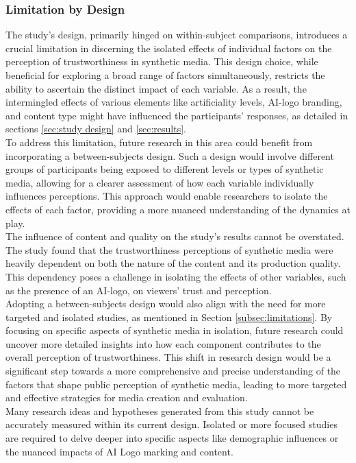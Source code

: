 \documentclass[
  a4paper,  %
  twoside,  %
  bibliography=totoc,
  headsepline,
  cleardoublepage=empty,
  parskip=half,
  draft=false
]{scrbook}
\begin{document}
\subsubsection{Limitation by Design}
The study's design, primarily hinged on within-subject comparisons, introduces a crucial limitation in discerning the isolated effects of individual factors on the perception of trustworthiness in synthetic media. This design choice, while beneficial for exploring a broad range of factors simultaneously, restricts the ability to ascertain the distinct impact of each variable. As a result, the intermingled effects of various elements like artificiality levels, AI-logo branding, and content type might have influenced the participants' responses, as detailed in sections \ref{sec:study design} and \ref{sec:results}. \\
To address this limitation, future research in this area could benefit from incorporating a between-subjects design. Such a design would involve different groups of participants being exposed to different levels or types of synthetic media, allowing for a clearer assessment of how each variable individually influences perceptions. This approach would enable researchers to isolate the effects of each factor, providing a more nuanced understanding of the dynamics at play. \\
The influence of content and quality on the study's results cannot be overstated. The study found that the trustworthiness perceptions of synthetic media were heavily dependent on both the nature of the content and its production quality. This dependency poses a challenge in isolating the effects of other variables, such as the presence of an AI-logo, on viewers' trust and perception. \\
Adopting a between-subjects design would also align with the need for more targeted and isolated studies, as mentioned in Section \ref{subsec:limitations}. By focusing on specific aspects of synthetic media in isolation, future research could uncover more detailed insights into how each component contributes to the overall perception of trustworthiness. This shift in research design would be a significant step towards a more comprehensive and precise understanding of the factors that shape public perception of synthetic media, leading to more targeted and effective strategies for media creation and evaluation. \\

Many research ideas and hypotheses generated from this study cannot be accurately measured within its current design. Isolated or more focused studies are required to delve deeper into specific aspects like demographic influences or the nuanced impacts of AI Logo marking and content.
\end{document}
